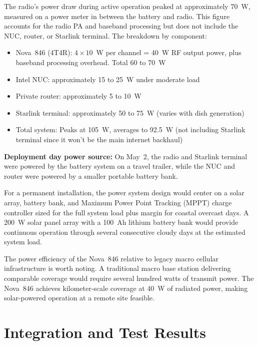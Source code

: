 \documentclass[
    left=1.5in,
    right=1.25in,
    top=1.25in,
    bottom=1.25in
]{CalPolySeniorProject}
\begin{document}
The radio's power draw during active operation peaked at approximately 70~W,
measured on a power meter in between the battery and radio. This figure accounts
for the radio PA and baseband processing but does not include the NUC, router,
or Starlink terminal. The breakdown by component:

\begin{itemize}
    \item Nova~846 (4T4R): $4 \times 10$~W per channel = 40~W RF output power,
    plus baseband processing overhead. Total 60 to 70~W
    \item Intel NUC: approximately 15 to 25~W under moderate load
    \item Private router: approximately 5 to 10~W
    \item Starlink terminal: approximately 50 to 75~W (varies with dish
    generation)
    \item Total system: Peaks at 105~W, averages to 92.5~W (not including
    Starlink terminal since it won't be the main internet backhaul)
\end{itemize}

\textbf{Deployment day power source:} On May~2, the radio and Starlink terminal
were powered by the battery system on a travel trailer, while the NUC and router
were powered by a smaller portable battery bank.

For a permanent installation, the power system design would center on a solar
array, battery bank, and Maximum Power Point Tracking (MPPT) charge controller sized for the full system load
plus margin for coastal overcast days. A 200~W solar panel array with a 100~Ah
lithium battery bank would provide continuous operation through several
consecutive cloudy days at the estimated system load.

The power efficiency of the Nova~846 relative to legacy macro cellular
infrastructure is worth noting. A traditional macro base station delivering
comparable coverage would require several hundred watts of transmit power. The
Nova~846 achieves kilometer-scale coverage at 40~W of radiated power,
making solar-powered operation at a remote site feasible.

\section{Integration and Test Results}
\end{document}
